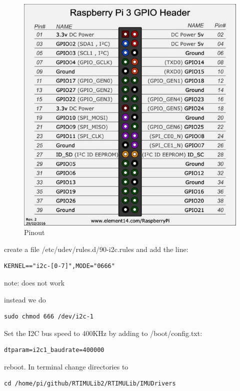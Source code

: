 \begin{figure}
\centering
\includegraphics{images/rasp3.jpg}
\caption{Pinout}
\end{figure}

create a file /etc/udev/rules.d/90-i2c.rules and add the line:

\begin{verbatim}
KERNEL=="i2c-[0-7]",MODE="0666"
\end{verbatim}

note: does not work

instead we do

\begin{verbatim}
sudo chmod 666 /dev/i2c-1 
\end{verbatim}

Set the I2C bus speed to 400KHz by adding to /boot/config.txt:

\begin{verbatim}
dtparam=i2c1_baudrate=400000
\end{verbatim}

reboot. In terminal change directories to

\begin{verbatim}
cd /home/pi/github/RTIMULib2/RTIMULib/IMUDrivers
\end{verbatim}


